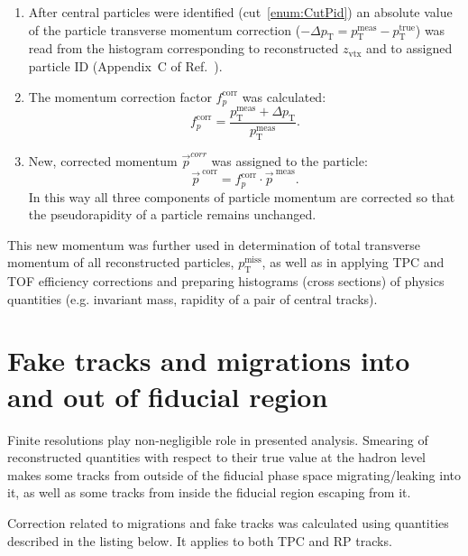\begin{enumerate}
	\item After central particles were identified (cut~\ref{enum:CutPid}) an absolute value of the particle transverse momentum correction ($-\Delta p_{\text{T}} = p_{\text{T}}^{\text{meas}}-p_{\text{T}}^{\text{true}}$) was read from the histogram corresponding to reconstructed $z_{\text{vtx}}$ and to assigned particle ID (Appendix~C of Ref.~\cite{supplementaryNote}).
	\item The momentum correction factor $f_{p}^{\text{corr}}$ was calculated:
	\begin{equation}\label{eq:pCorrFactor}
 f_{p}^{\text{corr}} = \frac{p_{\text{T}}^{\text{meas}} + \Delta p_{\text{T}}}{p_{\text{T}}^{\text{meas}}}.
  \end{equation}
  \item New, corrected momentum $\vec{p}^{corr}$ was assigned to the particle:
  \begin{equation}
   \vec{p}^{~\text{corr}} = f_{p}^{\text{corr}} \cdot \vec{p}^{~\text{meas}}.
  \end{equation}
  In this way all three components of particle momentum are corrected so that the pseudorapidity of a particle remains unchanged.
\end{enumerate}
This new momentum was further used in determination of total transverse momentum of all reconstructed particles, $p_{\text{T}}^{\text{miss}}$, as well as in applying TPC and TOF efficiency corrections and preparing histograms (cross sections) of physics quantities (e.g. invariant mass, rapidity of a pair of central tracks).



\section{Fake tracks and migrations into and out of fiducial region}\label{sec:migrations}

Finite resolutions play non-negligible role in presented analysis. Smearing of reconstructed quantities with respect to their true value at the hadron level makes some tracks from outside of the fiducial phase space migrating/leaking into it, as well as some tracks from inside the fiducial region escaping from it.

Correction related to migrations and fake tracks was calculated using quantities described in the listing below. It applies to both TPC and RP tracks.


